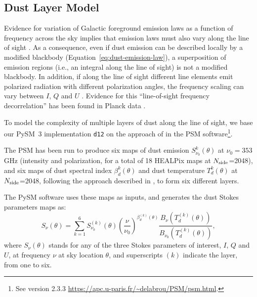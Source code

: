 \documentclass[twocolumn]{aastex631}
\begin{document}
\subsection{Dust Layer Model} \label{sec:layers}
Evidence for variation of Galactic foreground emission laws as a function of frequency across the sky implies that emission laws must also vary along the line of sight \citep{Martinez-Solaeche:2018}. As a consequence, even if dust emission can be described locally by a modified blackbody (Equation~\ref{eq:dust-emission-law}), a superposition of emission regions (i.e., an integral along the line of sight) is not a modified blackbody. In addition, if along the line of sight different line elements emit polarized radiation with different polarization angles, the frequency scaling can vary between $I$, $Q$ and $U$ \citep{Tassis:2015}. Evidence for this ``line-of-sight frequency decorrelation'' has been found in Planck data \citep{Pelgrims:2021}.

To model the complexity of multiple layers of dust along the line of sight, we base our PySM~3 implementation \texttt{d12} on the approach of \cite{Martinez-Solaeche:2018} in the PSM software\footnote{See version 2.3.3 \url{https://apc.u-paris.fr/~delabrou/PSM/psm.html}.}. 

The PSM has been run to produce six maps of dust emission $S_{\nu_0}^k(\theta)$ at $\nu_0 = 353$ GHz (intensity and polarization, for a total of 18 HEALPix maps at $N_{\rm side}$=2048), and six maps of dust spectral index $\beta_d^k(\theta)$ and dust temperature $T_d^k(\theta)$ at $N_{\rm side}$=2048, following the approach described in \cite{Martinez-Solaeche:2018}, to form six different layers.

The PySM software uses these maps as inputs, and generates the dust Stokes parameters maps as:
\begin{equation}
    S_\nu(\theta) = \sum_{k=1}^6 S^{(k)}_{\nu_0}(\theta)
    \left( \frac{\nu}{\nu_0} \right)^{\beta^{(k)}_d(\theta)}
    \frac{B_\nu(T^{(k)}_d(\theta))}{B_{\nu_0}(T^{(k)}_d(\theta))},
\end{equation}
where $S_\nu(\theta)$ stands for any of the three Stokes parameters of interest, $I$, $Q$ and $U$, at frequency $\nu$ at sky location $\theta$, and superscripts ${(k)}$ indicate the layer, from one to six.
\end{document}
